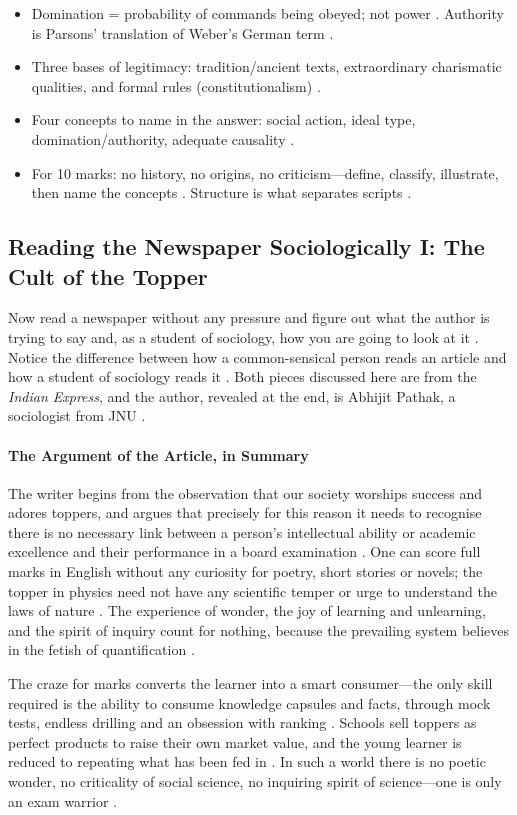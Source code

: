 \begin{QuickRevision}
\begin{itemize}
    \item Domination = probability of commands being obeyed; not power . Authority is Parsons' translation of Weber's German term .
    \item Three bases of legitimacy: tradition/ancient texts, extraordinary charismatic qualities, and formal rules (constitutionalism) .
    \item Four concepts to name in the answer: social action, ideal type, domination/authority, adequate causality .
    \item For 10 marks: no history, no origins, no criticism---define, classify, illustrate, then name the concepts . Structure is what separates scripts .
\end{itemize}
\end{QuickRevision}

\subsection{Reading the Newspaper Sociologically I: The Cult of the Topper}
Now read a newspaper without any pressure and figure out what the author is trying to say and, as a student of sociology, how you are going to look at it . Notice the difference between how a common-sensical person reads an article and how a student of sociology reads it . Both pieces discussed here are from the \textit{Indian Express}, and the author, revealed at the end, is Abhijit Pathak, a sociologist from JNU .

\paragraph{The Argument of the Article, in Summary}
The writer begins from the observation that our society worships success and adores toppers, and argues that precisely for this reason it needs to recognise there is no necessary link between a person's intellectual ability or academic excellence and their performance in a board examination . One can score full marks in English without any curiosity for poetry, short stories or novels; the topper in physics need not have any scientific temper or urge to understand the laws of nature .
The experience of wonder, the joy of learning and unlearning, and the spirit of inquiry count for nothing, because the prevailing system believes in the fetish of quantification .

The craze for marks converts the learner into a smart consumer---the only skill required is the ability to consume knowledge capsules and facts, through mock tests, endless drilling and an obsession with ranking . Schools sell toppers as perfect products to raise their own market value, and the young learner is reduced to repeating what has been fed in .
In such a world there is no poetic wonder, no criticality of social science, no inquiring spirit of science---one is only an exam warrior .

